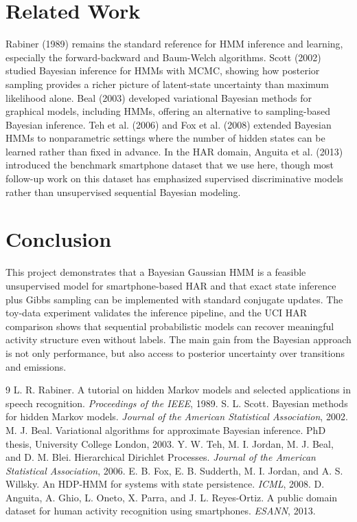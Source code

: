 \documentclass[11pt]{article}
\begin{document}
\section{Related Work}
Rabiner (1989) remains the standard reference for HMM inference and learning, especially the forward-backward and Baum-Welch algorithms. Scott (2002) studied Bayesian inference for HMMs with MCMC, showing how posterior sampling provides a richer picture of latent-state uncertainty than maximum likelihood alone. Beal (2003) developed variational Bayesian methods for graphical models, including HMMs, offering an alternative to sampling-based Bayesian inference. Teh et al. (2006) and Fox et al. (2008) extended Bayesian HMMs to nonparametric settings where the number of hidden states can be learned rather than fixed in advance. In the HAR domain, Anguita et al. (2013) introduced the benchmark smartphone dataset that we use here, though most follow-up work on this dataset has emphasized supervised discriminative models rather than unsupervised sequential Bayesian modeling.

\section{Conclusion}
This project demonstrates that a Bayesian Gaussian HMM is a feasible unsupervised model for smartphone-based HAR and that exact state inference plus Gibbs sampling can be implemented with standard conjugate updates. The toy-data experiment validates the inference pipeline, and the UCI HAR comparison shows that sequential probabilistic models can recover meaningful activity structure even without labels. The main gain from the Bayesian approach is not only performance, but also access to posterior uncertainty over transitions and emissions.

\begin{thebibliography}{9}
 L. R. Rabiner. A tutorial on hidden Markov models and selected applications in speech recognition. \textit{Proceedings of the IEEE}, 1989.
 S. L. Scott. Bayesian methods for hidden Markov models. \textit{Journal of the American Statistical Association}, 2002.
 M. J. Beal. Variational algorithms for approximate Bayesian inference. PhD thesis, University College London, 2003.
 Y. W. Teh, M. I. Jordan, M. J. Beal, and D. M. Blei. Hierarchical Dirichlet Processes. \textit{Journal of the American Statistical Association}, 2006.
 E. B. Fox, E. B. Sudderth, M. I. Jordan, and A. S. Willsky. An HDP-HMM for systems with state persistence. \textit{ICML}, 2008.
 D. Anguita, A. Ghio, L. Oneto, X. Parra, and J. L. Reyes-Ortiz. A public domain dataset for human activity recognition using smartphones. \textit{ESANN}, 2013.
\end{thebibliography}
\end{document}
